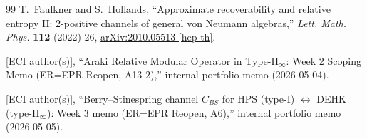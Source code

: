 \documentclass[12pt,a4paper]{article}
\theoremstyle{definition}
\begin{document}
\begin{thebibliography}{99}
T.~Faulkner and S.~Hollands,
``Approximate recoverability and relative entropy II: 2-positive channels
of general von Neumann algebras,''
\textit{Lett. Math. Phys.} \textbf{112} (2022) 26,
\href{https://arxiv.org/abs/2010.05513}{arXiv:2010.05513 [hep-th]}.

[ECI author(s)],
``Araki Relative Modular Operator in Type-II$_\infty$:
Week 2 Scoping Memo (ER=EPR Reopen, A13-2),''
internal portfolio memo (2026-05-04).

[ECI author(s)],
``Berry--Stinespring channel $C_{BS}$ for HPS (type-I) $\leftrightarrow$
DEHK (type-II$_\infty$): Week 3 memo (ER=EPR Reopen, A6),''
internal portfolio memo (2026-05-05).

\end{thebibliography}
\end{document}
